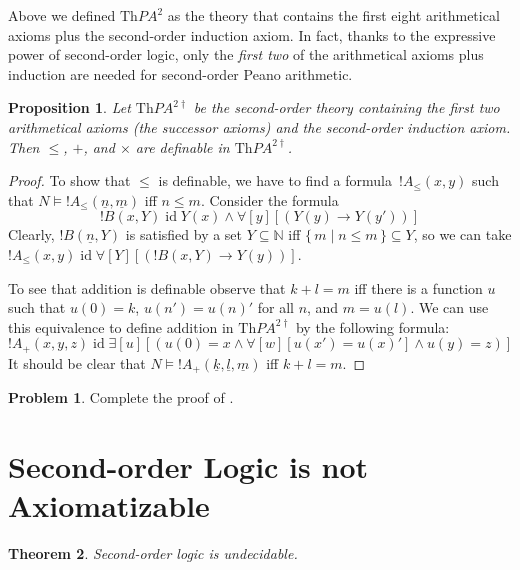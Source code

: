\documentclass[10pt,a4paper]{article}
\makeatletter
\theoremstyle{plain}
\newtheorem{thm}{Theorem}[section]
\newtheorem{prop}[thm]{Proposition}
\theoremstyle{definition}
\newtheorem{prob}{Problem}[section]
\theoremstyle{remark}
\newcommand*{\olfileid}[3]{}
\newcommand*{\olsection}[1]{\section*{#1}}
\newcommand*{\ollabel}[1]{\label{#1}}
\newcommand{\olref}{\@ifnextchar[{\olref@i}{\olref@final}}
\def\olref@i[#1]{\@ifnextchar[{\olref@ii}{\olref@final}}
\def\olref@ii[#1]{\@ifnextchar[{\olref@iii}{\olref@final}}
\def\olref@iii[#1]{\olref@final}
\def\olref@final#1{\ref{#1}}
\providecommand{\lif}{\mathbin{\rightarrow}}
\providecommand{\lforall}{\mathord{\forall}}
\providecommand{\lexists}{\mathord{\exists}}
\providecommand{\Obj}{}
\providecommand{\Sat}[2]{\ensuremath{#1 \models #2}}
\providecommand{\Th}{\ensuremath{\mathrm{Th}}}
\providecommand{\num}[1]{\underline{#1}}
\providecommand{\Nat}{\ensuremath{\mathbb{N}}}
\providecommand{\Setabs}[2]{\{\, #1 \mid #2 \,\}}
\providecommand{\ident}{\operatorname{id}}
\makeatother
\begin{document}
Above we defined $\Th{PA^2}$ as the theory that contains the first eight 
arithmetical axioms plus the second-order induction axiom.  In fact, thanks
to the expressive power of second-order logic, only the \emph{first two} 
of the arithmetical axioms plus induction are needed for second-order Peano 
arithmetic.

\begin{prop}\ollabel{prop:sol-pa-definable}
Let $\Th{PA^{2\dagger}}$ be the second-order theory containing the
first two arithmetical axioms (the successor axioms) and the
second-order induction axiom. Then $\le$, $+$, and $\times$ are definable
in $\Th{PA^{2\dagger}}$.
\end{prop}

\begin{proof}
To show that $\le$ is definable, we have to find a formula~$!A_\le(x, y)$
such that $\Sat{N}{!A_\le(\num n, \num m)}$ iff $n \le m$. Consider the formula
\[
!B(x, Y) \ident Y(x) \land \lforall[y][(Y(y) \lif Y(y'))]
\]
Clearly, $!B(\num n, Y)$ is satisfied by a set $Y \subseteq \Nat$ iff
$\Setabs{m}{n \le m} \subseteq Y$, so we can take $!A_\le(x, y) \ident
\lforall[Y][(!B(x, Y) \lif Y(y))]$.

To see that addition is definable observe that $k+l=m$ iff there is a
function $u$ such that $u(0)=k$, $u(n')=u(n)'$ for all $n$, and $m = u(l)$. 
We can use this equivalence to define addition in $\Th{PA^{2\dagger}}$ 
by the following formula:
\[
!A_+(x,y,z) \ident \lexists[u][(u(\Obj 0)=x \land \lforall[w][u(x')=u
 (x)'] \land u(y)=z)]
\] 
It should be clear that $\Sat{N}{!A_+(\num k, \num l, \num m)}$ 
iff $k+l=m$.
\end{proof}

\begin{prob}
Complete the proof of \olref[sol][met][spa]{prop:sol-pa-definable}.
\end{prob}





\olfileid{sol}{met}{nax}

\olsection{Second-order Logic is not Axiomatizable}


\begin{thm}
\ollabel{thm:sol-undecidable}
Second-order logic is undecidable.
\end{thm}
\end{document}
